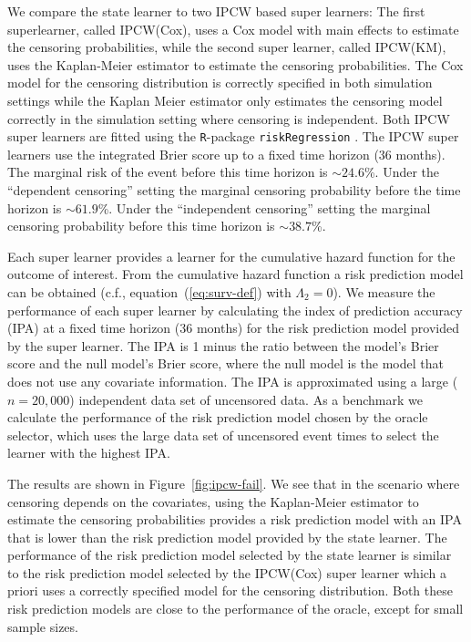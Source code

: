 \documentclass{statsoc}
\newcommand{\1}{\mathds{1}}
\begin{document}
We compare the state learner to two IPCW based super learners: The
first superlearner, called IPCW(Cox), uses a Cox model with main
effects to estimate the censoring probabilities, while the second
super learner, called IPCW(KM), uses the Kaplan-Meier estimator to
estimate the censoring probabilities. The Cox model for the censoring
distribution is correctly specified in both simulation settings while
the Kaplan Meier estimator only estimates the censoring model
correctly in the simulation setting where censoring is
independent. Both IPCW super learners are fitted using the
\texttt{R}-package \texttt{riskRegression}
\citep{Gerds_Ohlendorff_Ozenne_2023}.
%
%
The IPCW super learners use the integrated Brier score up to a fixed time
horizon (36 months). The marginal risk of the event before this time horizon is
\(\sim 24.6\)\%. Under the ``dependent censoring'' setting the marginal censoring
probability before the time horizon is \(\sim 61.9\)\%. Under the ``independent
censoring'' setting the marginal censoring probability before this time horizon
is \(\sim 38.7\)\%.

Each super learner provides a learner for the cumulative hazard function for the
outcome of interest. From the cumulative hazard function a risk prediction model
can be obtained (c.f., equation~(\ref{eq:surv-def}) with $\Lambda_2 = 0$). We
measure the performance of each super learner by calculating the index of
prediction accuracy (IPA) \citep{kattan2018index} at a fixed time horizon (36
months) for the risk prediction model provided by the super learner. The IPA is
1 minus the ratio between the model's Brier score and the null model's Brier
score, where the null model is the model that does not use any covariate
information. The IPA is approximated using a large (\( n = 20,000 \))
independent data set of uncensored data. As a benchmark we calculate the
performance of the risk prediction model chosen by the oracle selector, which
uses the large data set of uncensored event times to select the learner with the
highest IPA.

The results are shown in Figure~\ref{fig:ipcw-fail}. We see that in
the scenario where censoring depends on the covariates, using the
Kaplan-Meier estimator to estimate the censoring probabilities
provides a risk prediction model with an IPA that is lower than the
risk prediction model provided by the state learner. The performance
of the risk prediction model selected by the state learner is similar
to the risk prediction model selected by the IPCW(Cox) super learner
which a priori uses a correctly specified model for the censoring
distribution. Both these risk prediction models are close to the
performance of the oracle, except for small sample sizes.
\end{document}
